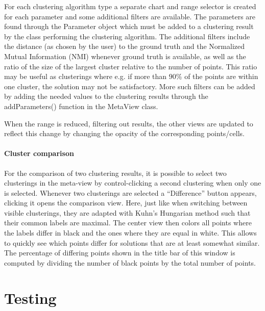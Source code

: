 \documentclass[
	a4paper,
	english,
	twoside,
	openright,               
	11pt                            
	]{report}
\begin{document}
For each clustering algorithm type a separate chart and range selector is created for each parameter and some additional filters are available. The parameters are found through the Parameter object which must be added to a clustering result by the class performing the clustering algorithm. The additional filters include the distance (as chosen by the user) to the ground truth and the Normalized Mutual Information (NMI) \cite{10.5555/1756006.1953024} whenever ground truth is available, as well as the ratio of the size of the largest cluster relative to the number of points. This ratio may be useful as clusterings where e.g. if more than $90\%$ of the points are within one cluster, the solution may not be satisfactory. More such filters can be added by adding the needed values to the clustering results through the addParameters() function in the MetaView class.

When the range is reduced, filtering out results, the other views are updated to reflect this change by changing the opacity of the corresponding points/cells.

\subsection{Cluster comparison}

For the comparison of two clustering results, it is possible to select two clusterings in the meta-view by control-clicking a second clustering when only one is selected. Whenever two clusterings are selected a ``Difference'' button appears, clicking it opens the comparison view. Here, just like when switching between visible clusterings, they are adapted with Kuhn’s Hungarian method \cite{Kuhn2010} such that their common labels are maximal. The center view then colors all points where the labels differ in black and the ones where they are equal in white. This allows to quickly see which points differ for solutions that are at least somewhat similar. The percentage of differing points shown in the title bar of this window is computed by dividing the number of black points by the total number of points.

\part{Testing}
\end{document}
